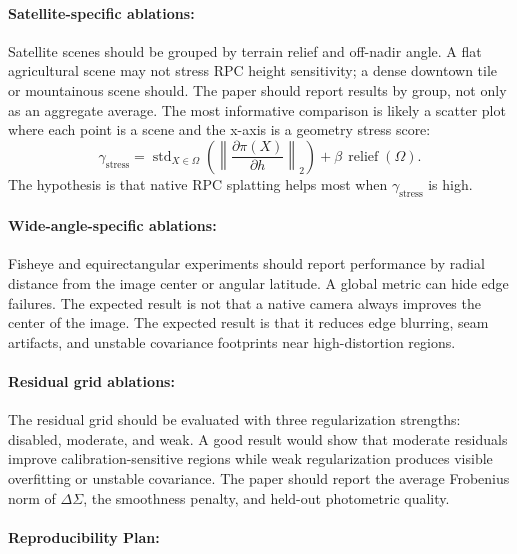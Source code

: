 \documentclass{article}
\begin{document}
\paragraph{Satellite-specific ablations:}

Satellite scenes should be grouped by terrain relief and off-nadir angle. A flat agricultural scene may not stress RPC height sensitivity; a dense downtown tile or mountainous scene should. The paper should report results by group, not only as an aggregate average. The most informative comparison is likely a scatter plot where each point is a scene and the x-axis is a geometry stress score:
\begin{equation}
  \gamma_{\text{stress}} = \operatorname{std}_{X\in\Omega}\left(\left\|\frac{\partial \pi(X)}{\partial h}\right\|_2\right)
  + \beta\,\operatorname{relief}(\Omega).
\end{equation}
The hypothesis is that native RPC splatting helps most when $\gamma_{\text{stress}}$ is high.

\paragraph{Wide-angle-specific ablations:}

Fisheye and equirectangular experiments should report performance by radial distance from the image center or angular latitude. A global metric can hide edge failures. The expected result is not that a native camera always improves the center of the image. The expected result is that it reduces edge blurring, seam artifacts, and unstable covariance footprints near high-distortion regions.

\paragraph{Residual grid ablations:}

The residual grid should be evaluated with three regularization strengths: disabled, moderate, and weak. A good result would show that moderate residuals improve calibration-sensitive regions while weak regularization produces visible overfitting or unstable covariance. The paper should report the average Frobenius norm of $\Delta\Sigma$, the smoothness penalty, and held-out photometric quality.

\paragraph{Reproducibility Plan:}
\end{document}

